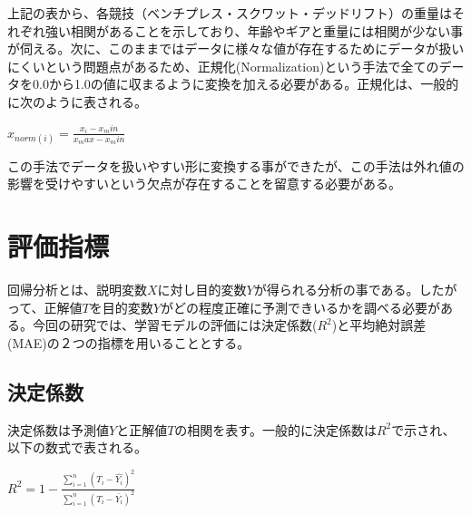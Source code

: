 \documentclass{article}
\begin{document}
上記の表から、各競技（ベンチプレス・スクワット・デッドリフト）の重量はそれぞれ強い相関があることを示しており、年齢やギアと重量には相関が少ない事が伺える。次に、このままではデータに様々な値が存在するためにデータが扱いにくいという問題点があるため、正規化(Normalization)という手法で全てのデータを0.0から1.0の値に収まるように変換を加える必要がある。正規化は、一般的に次のように表される。

\begin{center}
\begin{math}
x_{norm(i)} = \frac{x_i - x_min }{ x_max - x_min } 
\end{math}
\end{center}

この手法でデータを扱いやすい形に変換する事ができたが、この手法は外れ値の影響を受けやすいという欠点が存在することを留意する必要がある。


\section{評価指標}

回帰分析とは、説明変数\begin{math}X\end{math}に対し目的変数\begin{math}Y\end{math}が得られる分析の事である。したがって、正解値\begin{math}T\end{math}を目的変数\begin{math}Y\end{math}がどの程度正確に予測できいるかを調べる必要がある。今回の研究では、学習モデルの評価には決定係数(\begin{math}R^2\end{math})と平均絶対誤差(MAE)の２つの指標を用いることとする。

\subsection{決定係数}

決定係数は予測値\begin{math}Y\end{math}と正解値\begin{math}T\end{math}の相関を表す。一般的に決定係数は\begin{math}R^2\end{math}で示され、以下の数式で表される。

\begin{center}
\begin{math}R^2=1-\frac{\sum_{i=1}^{n}(T_i-\hat{Y_i})^2}{\sum_{i=1}^{n}(T_i-\bar{Y_i})^2}\end{math}
\end{center}
\end{document}
